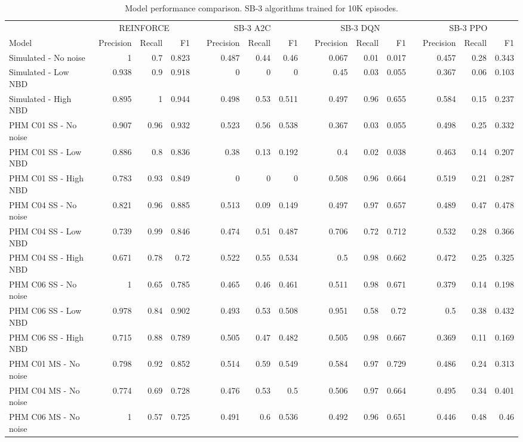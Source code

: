 \documentclass[]{article}
\newcommand{\rowspace}[1]{\renewcommand{\arraystretch}{#1}}
\begin{document}
\begin{landscape}
\begin{table*}\centering
	\rowspace{1.3}
	\begin{tabular}{@{}lrrrcrrrcrrrcrrr@{}} \arrayrulecolor{black!40}\toprule
		& \multicolumn{3}{c}{REINFORCE} & \phantom{i} & \multicolumn{3}{c}{SB-3 A2C} &
		\phantom{i} & \multicolumn{3}{c}{SB-3 DQN} & \phantom{i}& \multicolumn{3}{c}{SB-3 PPO} \\
		\cmidrule{2-4} \cmidrule{6-8} \cmidrule{10-12} \cmidrule{14-16}
		Model &Precision &Recall &F1 &  &Precision &Recall &F1 & &Precision &Recall &F1 & &Precision &Recall &F1\\ \midrule
		
		Simulated  - No noise &1 &0.7 &0.823 &  &0.487 &0.44 &0.46 & &0.067 &0.01 &0.017 & &0.457 &0.28 &0.343\\
		Simulated  - Low NBD &0.938 &0.9 &0.918 &  &0 &0 &0 & &0.45 &0.03 &0.055 & &0.367 &0.06 &0.103\\
		Simulated  - High NBD &0.895 &1 &0.944 &  &0.498 &0.53 &0.511 & &0.497 &0.96 &0.655 & &0.584 &0.15 &0.237\\ 
		\midrule
		PHM C01 SS - No noise &0.907 &0.96 &0.932 &  &0.523 &0.56 &0.538 & &0.367 &0.03 &0.055 & &0.498 &0.25 &0.332\\
		PHM C01 SS - Low NBD &0.886 &0.8 &0.836 &  &0.38 &0.13 &0.192 & &0.4 &0.02 &0.038 & &0.463 &0.14 &0.207\\
		PHM C01 SS - High NBD &0.783 &0.93 &0.849 &  &0 &0 &0 & &0.508 &0.96 &0.664 & &0.519 &0.21 &0.287\\
		\midrule
		PHM C04 SS - No noise &0.821 &0.96 &0.885 &  &0.513 &0.09 &0.149 & &0.497 &0.97 &0.657 & &0.489 &0.47 &0.478\\
		PHM C04 SS - Low NBD &0.739 &0.99 &0.846 &  &0.474 &0.51 &0.487 & &0.706 &0.72 &0.712 & &0.532 &0.28 &0.366\\
		PHM C04 SS - High NBD &0.671 &0.78 &0.72 &  &0.522 &0.55 &0.534 & &0.5 &0.98 &0.662 & &0.472 &0.25 &0.325\\
		\midrule
		PHM C06 SS - No noise &1 &0.65 &0.785 &  &0.465 &0.46 &0.461 & &0.511 &0.98 &0.671 & &0.379 &0.14 &0.198\\
		PHM C06 SS - Low NBD &0.978 &0.84 &0.902 &  &0.493 &0.53 &0.508 & &0.951 &0.58 &0.72 & &0.5 &0.38 &0.432\\
		PHM C06 SS - High NBD &0.715 &0.88 &0.789 &  &0.505 &0.47 &0.482 & &0.505 &0.98 &0.667 & &0.369 &0.11 &0.169\\
		\midrule
		PHM C01 MS - No noise &0.798 &0.92 &0.852 &  &0.514 &0.59 &0.549 & &0.584 &0.97 &0.729 & &0.486 &0.24 &0.313\\
		PHM C04 MS - No noise &0.774 &0.69 &0.728 &  &0.476 &0.53 &0.5 & &0.506 &0.97 &0.664 & &0.495 &0.34 &0.401\\
		PHM C06 MS - No noise &1 &0.57 &0.725 &  &0.491 &0.6 &0.536 & &0.492 &0.96 &0.651 & &0.446 &0.48 &0.46\\
		
	\bottomrule
\end{tabular}
\caption{Model performance comparison. SB-3 algorithms trained for 10K episodes.}
\end{table*}
\end{landscape}
\end{document}

